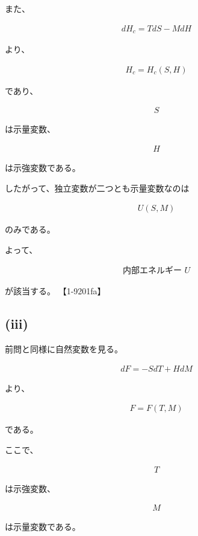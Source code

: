 \documentclass[platex,dvipdfmx,a4paper]{jsarticle}
\begin{document}
また、

\begin{align*}
dH_c
=
TdS-MdH
\end{align*}

より、

\begin{align*}
H_c=H_c(S,H)
\end{align*}

であり、

\begin{align*}
S
\end{align*}

は示量変数、

\begin{align*}
H
\end{align*}

は示強変数である。

したがって、独立変数が二つとも示量変数なのは

\begin{align*}
U(S,M)
\end{align*}

のみである。

よって、

\begin{align*}
\boxed{\text{内部エネルギー }U}
\end{align*}

が該当する。 【1-9201fa】

\subsection{(iii)}

前問と同様に自然変数を見る。

\begin{align*}
dF
=
-SdT+HdM
\end{align*}

より、

\begin{align*}
F=F(T,M)
\end{align*}

である。

ここで、

\begin{align*}
T
\end{align*}

は示強変数、

\begin{align*}
M
\end{align*}

は示量変数である。
\end{document}
